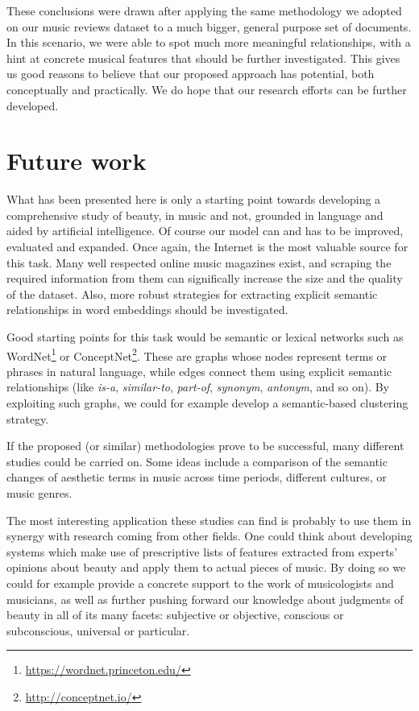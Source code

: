 These conclusions were drawn after applying the same methodology we adopted on our music reviews dataset to a much bigger, general purpose set of documents. In this scenario, we were able to spot much more meaningful relationships, with a hint at concrete musical features that should be further investigated. This gives us good reasons to believe that our proposed approach has potential, both conceptually and practically. We do hope that our research efforts can be further developed.

\section{Future work}
What has been presented here is only a starting point towards developing a comprehensive study of beauty, in music and not, grounded in language and aided by artificial intelligence. Of course our model can and has to be improved, evaluated and expanded. Once again, the Internet is the most valuable source for this task. Many well respected online music magazines exist, and scraping the required information from them can significally increase the size and the quality of the dataset. Also, more robust strategies for extracting explicit semantic relationships in word embeddings should be investigated.

Good starting points for this task would be semantic or lexical networks such as WordNet\footnote{\url{https://wordnet.princeton.edu/}} or ConceptNet\footnote{\url{http://conceptnet.io/}}. These are graphs whose nodes represent terms or phrases in natural language, while edges connect them using explicit semantic relationships (like \emph{is-a}, \emph{similar-to}, \emph{part-of}, \emph{synonym}, \emph{antonym}, and so on). By exploiting such graphs, we could for example develop a semantic-based clustering strategy.

If the proposed (or similar) methodologies prove to be successful, many different studies could be carried on. Some ideas include a comparison of the semantic changes of aesthetic terms in music across time periods, different cultures, or music genres.

The most interesting application these studies can find is probably to use them in synergy with research coming from other fields. One could think about developing systems which make use of prescriptive lists of features extracted from experts' opinions about beauty and apply them to actual pieces of music. By doing so we could for example provide a concrete support to the work of musicologists and musicians, as well as further pushing forward our knowledge about judgments of beauty in all of its many facets: subjective or objective, conscious or subconscious, universal or particular.
